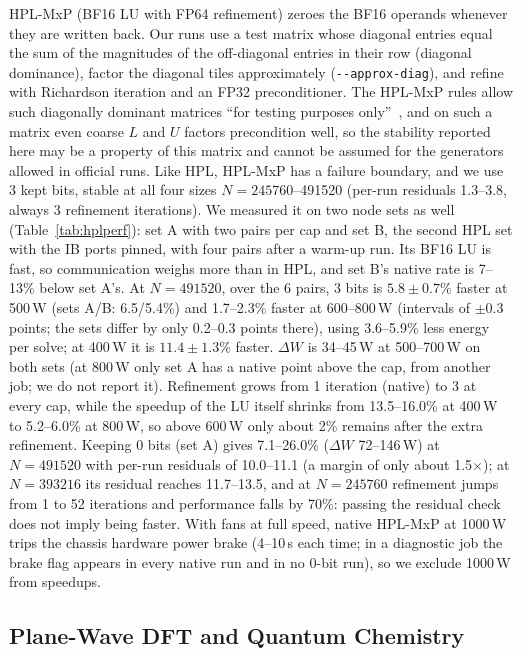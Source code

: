 \documentclass[conference]{IEEEtran}
\newcommand{\W}{\,W}
\newcommand{\pct}{\%}
\begin{document}
HPL-MxP (BF16 LU with FP64 refinement) zeroes the BF16 operands whenever they are written back. Our runs use a test
matrix whose diagonal entries equal the sum of the magnitudes of the off-diagonal entries in their row (diagonal
dominance), factor the diagonal tiles approximately (\texttt{-{}-approx-diag}), and refine with Richardson iteration
and an FP32 preconditioner. The HPL-MxP rules allow such diagonally dominant matrices ``for testing purposes
only''~\cite{HPLMxPRules}, and on such a matrix even coarse $L$ and $U$ factors precondition well, so the stability
reported here may be a property of this matrix and cannot be assumed for the generators allowed in official runs.
Like HPL, HPL-MxP has a failure boundary, and we use 3 kept bits, stable at all four sizes $N=245760$--491520
(per-run residuals 1.3--3.8, always 3 refinement iterations). We measured it on two node sets as well (Table~\ref{tab:hplperf}):
set A with two pairs per cap and set B, the second HPL set with the IB ports pinned, with four pairs after a warm-up
run. Its BF16 LU is fast, so communication weighs more than in HPL, and set B's native rate is 7--13\pct{} below set
A's. At $N=491520$, over the 6 pairs, 3 bits is $5.8\pm0.7\pct$ faster at 500\W{} (sets A/B: 6.5/5.4\pct) and
1.7--2.3\pct{} faster at 600--800\W{} (intervals of $\pm$0.3 points; the sets differ by only 0.2--0.3 points there),
using 3.6--5.9\pct{} less energy per solve; at 400\W{} it is $11.4\pm1.3\pct$ faster. $\Delta W$ is 34--45\W{} at
500--700\W{} on both sets (at 800\W{} only set A has a native point above the cap, from another job; we do not report it). Refinement
grows from 1 iteration (native) to 3 at every cap, while the speedup of the LU itself shrinks from 13.5--16.0\pct{} at
400\W{} to 5.2--6.0\pct{} at 800\W, so above 600\W{} only about 2\pct{} remains after the extra refinement. Keeping 0
bits (set A) gives 7.1--26.0\pct{} ($\Delta W$ 72--146\W) at $N=491520$ with per-run residuals of
10.0--11.1 (a margin of only about 1.5$\times$); at $N=393216$ its residual reaches 11.7--13.5, and at $N=245760$
refinement jumps from 1 to 52 iterations and
performance falls by 70\pct: passing the residual check does not imply being faster. With fans at full speed, native
HPL-MxP at 1000\W{} trips the chassis hardware power brake (4--10\,s each time; in a diagnostic job the brake flag appears in
every native run and in no 0-bit run), so we exclude 1000\W{} from speedups.

\subsection{Plane-Wave DFT and Quantum Chemistry}\label{sec:sci}
\end{document}

